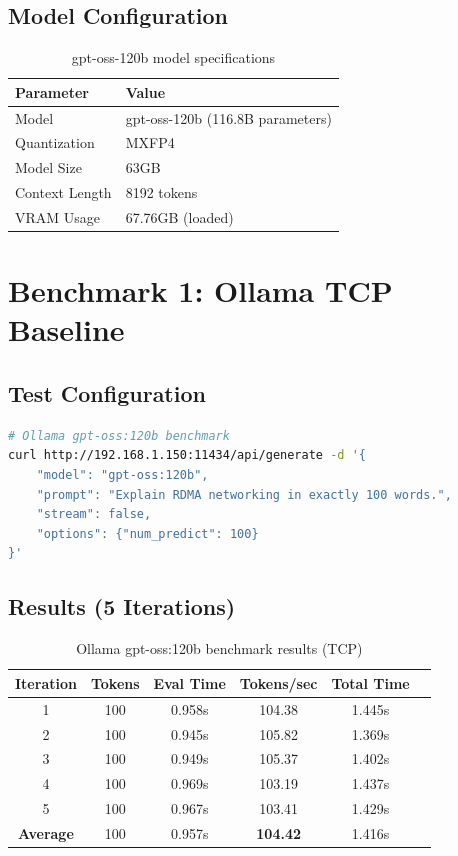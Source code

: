 \documentclass[10pt,letterpaper]{article}
\begin{document}
\subsection{Model Configuration}

\begin{table}[H]
\centering
\small
\begin{tabular}{@{}ll@{}}
\toprule
\textbf{Parameter} & \textbf{Value} \\
\midrule
Model & gpt-oss-120b \cite{gptoss-hf} (116.8B parameters) \\
Quantization & MXFP4 \cite{mxfp4-paper} \\
Model Size & 63GB \\
Context Length & 8192 tokens \\
VRAM Usage & 67.76GB (loaded) \\
\bottomrule
\end{tabular}
\caption{gpt-oss-120b model specifications}
\end{table}

\section{Benchmark 1: Ollama TCP Baseline}

\subsection{Test Configuration}

\begin{lstlisting}[language=bash]
# Ollama gpt-oss:120b benchmark
curl http://192.168.1.150:11434/api/generate -d '{
    "model": "gpt-oss:120b",
    "prompt": "Explain RDMA networking in exactly 100 words.",
    "stream": false,
    "options": {"num_predict": 100}
}'
\end{lstlisting}

\subsection{Results (5 Iterations)}

\begin{table}[H]
\centering
\small
\begin{tabular}{@{}cccccc@{}}
\toprule
\textbf{Iteration} & \textbf{Tokens} & \textbf{Eval Time} & \textbf{Tokens/sec} & \textbf{Total Time} \\
\midrule
1 & 100 & 0.958s & 104.38 & 1.445s \\
2 & 100 & 0.945s & 105.82 & 1.369s \\
3 & 100 & 0.949s & 105.37 & 1.402s \\
4 & 100 & 0.969s & 103.19 & 1.437s \\
5 & 100 & 0.967s & 103.41 & 1.429s \\
\midrule
\textbf{Average} & 100 & 0.957s & \textbf{104.42} & 1.416s \\
\bottomrule
\end{tabular}
\caption{Ollama gpt-oss:120b benchmark results (TCP)}
\end{table}
\end{document}

